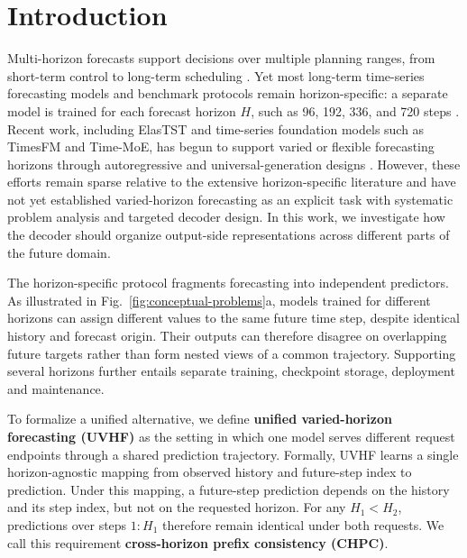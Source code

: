 \section{Introduction}
\label{sec:introduction}


Multi-horizon forecasts support decisions over multiple planning ranges, from short-term control to long-term scheduling \citep{zeng2023dlinear}. Yet most long-term time-series forecasting models and benchmark protocols remain horizon-specific: a separate model is trained for each forecast horizon $H$, such as 96, 192, 336, and 720 steps \citep{nie2023patchtst,liu2024itransformer}. Recent work, including ElasTST\citep{zhang2024elastst} and time-series foundation models such as TimesFM\citep{das2024timesfm} and Time-MoE\citep{shi2025timemoe}, has begun to support varied or flexible forecasting horizons through autoregressive and universal-generation designs \citep{liu2024timer,ansari2024chronos,woo2024moirai}. However, these efforts remain sparse relative to the extensive horizon-specific literature and have not yet established varied-horizon forecasting as an explicit task with systematic problem analysis and targeted decoder design. In this work, we investigate how the decoder should organize output-side representations across different parts of the future domain.

The horizon-specific protocol fragments forecasting into independent predictors. As illustrated in Fig.~\ref{fig:conceptual-problems}a, models trained for different horizons can assign different values to the same future time step, despite identical history and forecast origin. Their outputs can therefore disagree on overlapping future targets rather than form nested views of a common trajectory. Supporting several horizons further entails separate training, checkpoint storage, deployment and maintenance.

To formalize a unified alternative, we define \textbf{unified varied-horizon forecasting (UVHF)} as the setting in which one model serves different request endpoints through a shared prediction trajectory. Formally, UVHF learns a single horizon-agnostic mapping from observed history and future-step index to prediction. Under this mapping, a future-step prediction depends on the history and its step index, but not on the requested horizon. For any $H_1<H_2$, predictions over steps $1{:}H_1$ therefore remain identical under both requests. We call this requirement \textbf{cross-horizon prefix consistency (CHPC)}.

